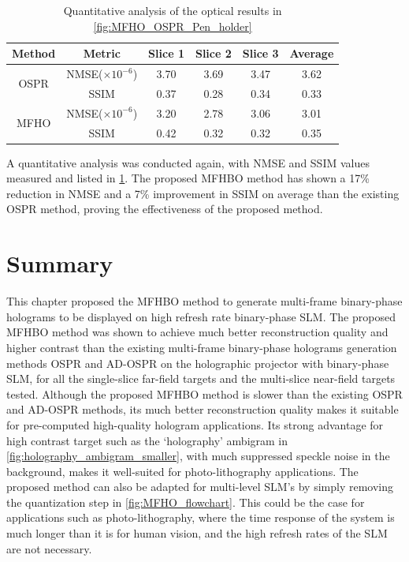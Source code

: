 	\begin{table}[H]
	\centering
	\begin{tabular}{|c|c|c|c|c|c|}
	\hline
	\textbf{Method} & \textbf{Metric} & \textbf{Slice 1} & \textbf{Slice 2} & \textbf{Slice 3} & \textbf{Average} \\ \hline
	\multirow{2}{*}{OSPR} & NMSE($\times 10^{-6}$) & 3.70 & 3.69 & 3.47 & 3.62 \\ \cline{2-6}
						  & SSIM                   & 0.37 & 0.28 & 0.34 & 0.33 \\ \hline
	\multirow{2}{*}{MFHO} & NMSE($\times 10^{-6}$) & 3.20 & 2.78 & 3.06 & 3.01 \\ \cline{2-6}
						  & SSIM                   & 0.42 & 0.32 & 0.32 & 0.35 \\ \hline
	\end{tabular}
	\caption{Quantitative analysis of the optical results in \cref{fig:MFHO_OSPR_Pen_holder}}
	\label{tab:quant_MFHO_Pen_holder}
	\end{table}

	A quantitative analysis was conducted again, with NMSE and SSIM values measured and listed in \cref{tab:quant_MFHO_Pen_holder}. The proposed MFHBO method has shown a 17\% reduction in NMSE and a 7\% improvement in SSIM on average than the existing OSPR method, proving the effectiveness of the proposed method.


\section{Summary}
	This chapter proposed the MFHBO method to generate multi-frame binary-phase holograms to be displayed on high refresh rate binary-phase SLM. The proposed MFHBO method was shown to achieve much better reconstruction quality and higher contrast than the existing multi-frame binary-phase holograms generation methods OSPR \cite{Cable2004} and AD-OSPR \cite{Kaczorowski2016} on the holographic projector with binary-phase SLM, for all the single-slice far-field targets and the multi-slice near-field targets tested. Although the proposed MFHBO method is slower than the existing OSPR and AD-OSPR methods, its much better reconstruction quality makes it suitable for pre-computed high-quality hologram applications. Its strong advantage for high contrast target such as the `holography' ambigram in \cref{fig:holography_ambigram_smaller}, with much suppressed speckle noise in the background, makes it well-suited for photo-lithography applications. The proposed method can also be adapted for multi-level SLM's by simply removing the quantization step in \cref{fig:MFHO_flowchart}. This could be the case for applications such as photo-lithography, where the time response of the system is much longer than it is for human vision, and the high refresh rates of the SLM are not necessary.


